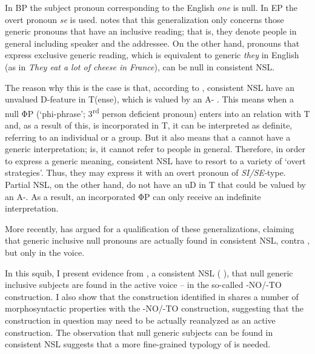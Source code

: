 \documentclass[output=paper]{LSP/langsci}
\begin{document}
\z

In BP the subject pronoun corresponding to the English \textit{one} is null. In EP the overt pronoun \textit{se} is used. \citet{Holmberg2010Null} notes that this generalization only concerns those generic pronouns that have an inclusive reading; that is, they denote people in general including speaker and the addressee. On the other hand, pronouns that express exclusive generic reading, which is equivalent to generic \textit{they} in English (as in \textit{They eat a lot of cheese in France}), can be null in consistent NSL.

The reason why this is the case is that, according to \citet{Holmberg2005,Holmberg2010Null}, consistent NSL have an unvalued D-feature in T(ense), which is valued by an A- \citep{Frascarelli2007}. This means when a null ΦP (‘phi-phrase’; 3\textsuperscript{rd} person deficient pronoun) enters into an  relation with T and, as a result of this, is incorporated in T, it can be interpreted as definite, referring to an individual or a group. But it also means that a  cannot have a generic interpretation; is, it cannot refer to people in general. Therefore, in order to express a generic meaning, consistent NSL have to resort to a variety of ‘overt strategies’. Thus, they may express it with an overt pronoun of \textit{SI/SE-}type. Partial NSL, on the other hand, do not have an uD in T that could be valued by an A-. As a result, an incorporated ΦP can only receive an indefinite interpretation.

More recently, \citet{FassiFehri2009} has argued for a qualification of these generalizations, claiming that generic inclusive null pronouns are actually found in consistent NSL, contra \citet{Holmberg2005,Holmberg2010Null}, but only in the  voice.

In this squib, I present evidence from , a consistent NSL (  \citealt{Sigurðsson2009}), that null generic inclusive subjects are found in the active voice – in the so-called -NO/-TO construction. I also show that the  construction identified in \citet{FassiFehri2009} shares a number of morphosyntactic properties with the -NO/-TO construction, suggesting that the construction in question may need to be actually reanalyzed as an active construction. The observation that null generic subjects can be found in consistent NSL suggests that a more fine-grained typology of  is needed.
\end{document}
